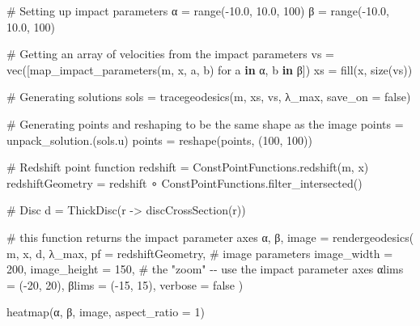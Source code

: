 \documentclass[
  letterpaper,
  DIV=11,
  numbers=noendperiod]{scrreprt}
\newenvironment{Shaded}{\begin{snugshade}}{\end{snugshade}}
\newcommand{\CommentTok}[1]{\textcolor[rgb]{0.37,0.37,0.37}{#1}}
\newcommand{\ConstantTok}[1]{\textcolor[rgb]{0.56,0.35,0.01}{#1}}
\newcommand{\FloatTok}[1]{\textcolor[rgb]{0.68,0.00,0.00}{#1}}
\newcommand{\FunctionTok}[1]{\textcolor[rgb]{0.28,0.35,0.67}{#1}}
\newcommand{\KeywordTok}[1]{\textcolor[rgb]{0.00,0.23,0.31}{\textbf{#1}}}
\newcommand{\NormalTok}[1]{\textcolor[rgb]{0.00,0.23,0.31}{#1}}
\newcommand{\OperatorTok}[1]{\textcolor[rgb]{0.37,0.37,0.37}{#1}}
\begin{document}
\begin{Shaded}
\begin{Highlighting}[]
\CommentTok{\# Setting up impact parameters}
\NormalTok{α }\OperatorTok{=} \FunctionTok{range}\NormalTok{(}\OperatorTok{{-}}\FloatTok{10.0}\NormalTok{, }\FloatTok{10.0}\NormalTok{, }\FloatTok{100}\NormalTok{)}
\NormalTok{β }\OperatorTok{=} \FunctionTok{range}\NormalTok{(}\OperatorTok{{-}}\FloatTok{10.0}\NormalTok{, }\FloatTok{10.0}\NormalTok{, }\FloatTok{100}\NormalTok{)}

\CommentTok{\# Getting an array of velocities from the impact parameters}
\NormalTok{vs }\OperatorTok{=} \FunctionTok{vec}\NormalTok{([}\FunctionTok{map\_impact\_parameters}\NormalTok{(m, x, a, b) for a }\KeywordTok{in}\NormalTok{ α, b }\KeywordTok{in}\NormalTok{ β])}
\NormalTok{xs }\OperatorTok{=} \FunctionTok{fill}\NormalTok{(x, }\FunctionTok{size}\NormalTok{(vs))}

\CommentTok{\# Generating solutions}
\NormalTok{sols }\OperatorTok{=} \FunctionTok{tracegeodesics}\NormalTok{(m, xs, vs, λ\_max, save\_on }\OperatorTok{=} \ConstantTok{false}\NormalTok{)}

\CommentTok{\# Generating points and reshaping to be the same shape as the image}
\NormalTok{points }\OperatorTok{=} \FunctionTok{unpack\_solution}\NormalTok{.(sols.u)}
\NormalTok{points }\OperatorTok{=} \FunctionTok{reshape}\NormalTok{(points, (}\FloatTok{100}\NormalTok{, }\FloatTok{100}\NormalTok{))}

\CommentTok{\# Redshift point function}
\NormalTok{redshift }\OperatorTok{=}\NormalTok{ ConstPointFunctions.}\FunctionTok{redshift}\NormalTok{(m, x)}
\NormalTok{redshiftGeometry }\OperatorTok{=}\NormalTok{ redshift }\OperatorTok{∘}\NormalTok{ ConstPointFunctions.}\FunctionTok{filter\_intersected}\NormalTok{()}

\CommentTok{\# Disc}
\NormalTok{d }\OperatorTok{=} \FunctionTok{ThickDisc}\NormalTok{(r }\OperatorTok{{-}\textgreater{}} \FunctionTok{discCrossSection}\NormalTok{(r))}

\CommentTok{\# this function returns the impact parameter axes}
\NormalTok{α, β, image }\OperatorTok{=} \FunctionTok{rendergeodesics}\NormalTok{(}
\NormalTok{    m, x, d, λ\_max, pf }\OperatorTok{=}\NormalTok{ redshiftGeometry,}
    \CommentTok{\# image parameters}
\NormalTok{    image\_width }\OperatorTok{=} \FloatTok{200}\NormalTok{, image\_height }\OperatorTok{=} \FloatTok{150}\NormalTok{,}
    \CommentTok{\# the "zoom" {-}{-} use the impact parameter axes}
\NormalTok{    αlims }\OperatorTok{=}\NormalTok{ (}\OperatorTok{{-}}\FloatTok{20}\NormalTok{, }\FloatTok{20}\NormalTok{), βlims }\OperatorTok{=}\NormalTok{ (}\OperatorTok{{-}}\FloatTok{15}\NormalTok{, }\FloatTok{15}\NormalTok{), verbose }\OperatorTok{=} \ConstantTok{false}
\NormalTok{)}

\FunctionTok{heatmap}\NormalTok{(α, β, image, aspect\_ratio }\OperatorTok{=} \FloatTok{1}\NormalTok{)}
\end{Highlighting}
\end{Shaded}
\end{document}
